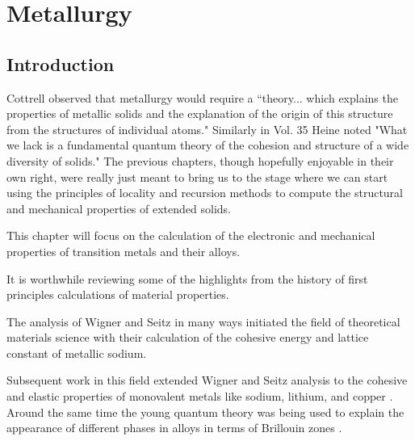 \chapter{Metallurgy}
\label{chap:metallurgy}
\section{Introduction}
Cottrell observed that metallurgy would require a ``theory... which explains
the properties of metallic solids and the explanation of the origin of this
structure from the structures of individual atoms." Similarly in Vol. 35
Heine noted "What we lack is a fundamental quantum theory of the cohesion
and structure of a wide diversity of solids." The previous chapters,
though hopefully enjoyable in their own right, were really just meant to bring
us to the stage where we can start using the principles of locality
and recursion methods to compute the structural and 
mechanical properties of extended solids.

This chapter will focus on the calculation of the electronic and mechanical
properties of transition metals and their alloys. 


%

It is worthwhile reviewing some of the highlights from the history
of first principles calculations of material properties.

The analysis of Wigner and Seitz in many ways initiated the field
of theoretical materials science with their calculation of the cohesive
energy and lattice constant of metallic sodium\cite{wigner33, wigner34}.

Subsequent work in this field extended Wigner and Seitz analysis
to the cohesive and elastic properties of monovalent
metals like sodium, lithium, and copper \cite{fuchs36}. Around
the same time the young quantum theory was being
used to explain the appearance of different phases in alloys in terms 
of Brillouin zones \cite{bethe29, bouckhaert36, owen33, jones34}. 


